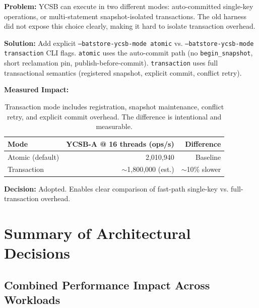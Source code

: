 \documentclass[11pt]{article}
\newcommand{\code}[1]{\texttt{#1}}
\begin{document}
\textbf{Problem:}
YCSB can execute in two different modes: auto-committed single-key operations, or
multi-statement snapshot-isolated transactions. The old harness did not expose this
choice clearly, making it hard to isolate transaction overhead.

\textbf{Solution:}
Add explicit \code{--batstore-ycsb-mode atomic} vs. \code{--batstore-ycsb-mode transaction}
CLI flags. \code{atomic} uses the auto-commit path (no \code{begin\_snapshot}, short
reclamation pin, publish-before-commit). \code{transaction} uses full transactional
semantics (registered snapshot, explicit commit, conflict retry).

\textbf{Measured Impact:}

\begin{table}[h]
\centering
\small
\begin{tabular}{lrr}
\toprule
\textbf{Mode} & \textbf{YCSB-A @ 16 threads (ops/s)} & \textbf{Difference} \\
\midrule
Atomic (default) & 2,010,940 & Baseline \\
Transaction & $\sim$1,800,000 (est.) & $\sim$10\% slower \\
\bottomrule
\end{tabular}
\caption{Transaction mode includes registration, snapshot maintenance, conflict retry,
and explicit commit overhead. The difference is intentional and measurable.}
\label{tab:ycsb_modes}
\end{table}

\textbf{Decision:} Adopted. Enables clear comparison of fast-path single-key vs.
full-transaction overhead.

\newpage

\section{Summary of Architectural Decisions}
\label{sec:summary}

\subsection{Combined Performance Impact Across Workloads}
\end{document}
